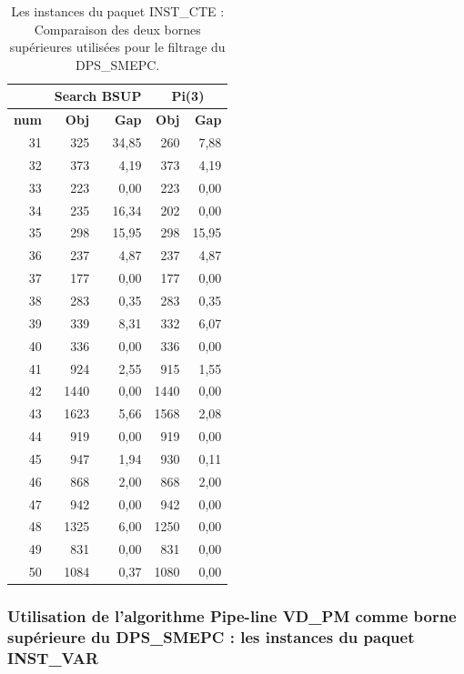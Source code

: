 \begin{table}[H]
	\centering
	\small
	\begin{tabular}{|r|rr|rr|}
		\toprule
		\hline
		\rowcolor{cyan}	& \multicolumn{2}{c|}{\textbf{ Search BSUP}}&\multicolumn{2}{c|}{\textbf{Pi(3)}} \\ \hline
	\midrule
	\rowcolor{cyan}	\textbf{num} & \textbf{Obj}& \textbf{Gap}  & \textbf{Obj}& \textbf{Gap}   \\ \hline
	\midrule
	
	31	&	325	&	34,85	&	260	&	7,88	\\ \hline
	32	&	373	&	4,19	&	373	&	4,19	\\ \hline
	33	&	223	&	0,00	&	223	&	0,00	\\ \hline
	34	&	235	&	16,34	&	202	&	0,00	\\ \hline
	35	&	298	&	15,95	&	298	&	15,95	\\ \hline
	36	&	237	&	4,87	&	237	&	4,87	\\ \hline
	37	&	177	&	0,00	&	177	&	0,00	\\ \hline
	38	&	283	&	0,35	&	283	&	0,35	\\ \hline
	39	&	339	&	8,31	&	332	&	6,07	\\ \hline
	40	&	336	&	0,00	&	336	&	0,00	\\ \hline
	41	&	924	&	2,55	&	915	&	1,55	\\ \hline
	42	&	1440	&	0,00	&	1440	&	0,00	\\ \hline
	43	&	1623	&	5,66	&	1568	&	2,08	\\ \hline
	44	&	919	&	0,00	&	919	&	0,00	\\ \hline
	45	&	947	&	1,94	&	930	&	0,11	\\ \hline
	46	&	868	&	2,00	&	868	&	2,00	\\ \hline
	47	&	942	&	0,00	&	942	&	0,00	\\ \hline
	48	&	1325	&	6,00	&	1250	&	0,00	\\ \hline
	49	&	831	&	0,00	&	831	&	0,00	\\ \hline
	50	&	1084	&	0,37	&	1080	&	0,00	\\ \hline
	
	\bottomrule
\end{tabular}%
\caption{Les instances du paquet INST\_CTE : Comparaison des deux bornes supérieures utilisées pour le filtrage du DPS\_SMEPC.}

\label{BSUP_avant_apres_A}%
\end{table}%


\subsubsection{Utilisation de l'algorithme \textbf{Pipe-line VD\_PM} comme borne supérieure du DPS\_SMEPC : les instances du paquet INST\_VAR}

